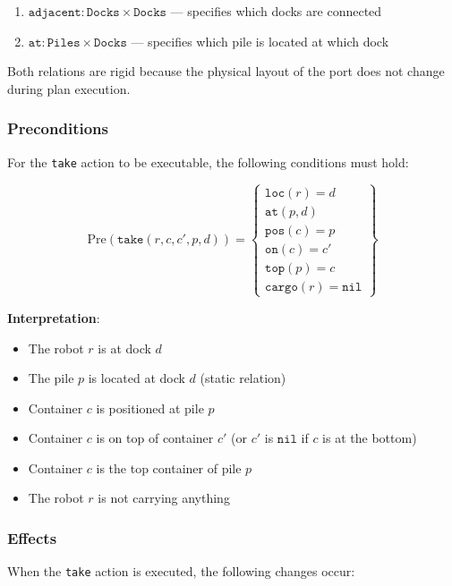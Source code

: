 \documentclass[11pt,a4paper]{article}
\theoremstyle{definition}
\theoremstyle{plain}
\theoremstyle{remark}
\begin{document}
\begin{enumerate}
    \item $\texttt{adjacent}: \texttt{Docks} \times \texttt{Docks}$ — specifies which docks are connected
    \item $\texttt{at}: \texttt{Piles} \times \texttt{Docks}$ — specifies which pile is located at which dock
\end{enumerate}

Both relations are rigid because the physical layout of the port does not change during plan execution.

\subsubsection{Preconditions}

For the \texttt{take} action to be executable, the following conditions must hold:

\[
\text{Pre}(\texttt{take}(r, c, c', p, d)) = \left\{
\begin{array}{l}
\texttt{loc}(r) = d \\
\texttt{at}(p, d) \\
\texttt{pos}(c) = p \\
\texttt{on}(c) = c' \\
\texttt{top}(p) = c \\
\texttt{cargo}(r) = \texttt{nil}
\end{array}
\right\}
\]

\textbf{Interpretation}:
\begin{itemize}
    \item The robot $r$ is at dock $d$
    \item The pile $p$ is located at dock $d$ (static relation)
    \item Container $c$ is positioned at pile $p$
    \item Container $c$ is on top of container $c'$ (or $c'$ is $\texttt{nil}$ if $c$ is at the bottom)
    \item Container $c$ is the top container of pile $p$
    \item The robot $r$ is not carrying anything
\end{itemize}

\subsubsection{Effects}

When the \texttt{take} action is executed, the following changes occur:
\end{document}
